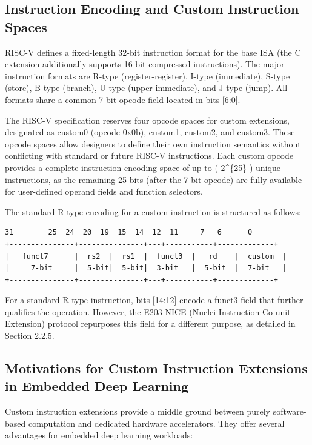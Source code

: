 \subsection{Instruction Encoding and Custom Instruction Spaces}

RISC-V defines a fixed-length 32-bit instruction format for the base ISA (the C extension additionally supports 16-bit compressed instructions). The major instruction formats are R-type (register-register), I-type (immediate), S-type (store), B-type (branch), U-type (upper immediate), and J-type (jump). All formats share a common 7-bit opcode field located in bits [6:0].


The RISC-V specification reserves four opcode spaces for custom extensions, designated as custom0 (opcode 0x0b), custom1, custom2, and custom3. These opcode spaces allow designers to define their own instruction semantics without conflicting with standard or future RISC-V instructions. Each custom opcode provides a complete instruction encoding space of up to ( 2\textasciicircum{}\{25\} ) unique instructions, as the remaining 25 bits (after the 7-bit opcode) are fully available for user-defined operand fields and function selectors.


The standard R-type encoding for a custom instruction is structured as follows:


\begin{lstlisting}[style=ascii]
31        25  24  20  19  15  14  12  11     7   6      0
+---------------+---------------+---+-----------+-------------+
|   funct7      |  rs2  |  rs1  |  funct3  |   rd    |  custom  |
|     7-bit     |  5-bit|  5-bit|  3-bit   |  5-bit  |  7-bit   |
+---------------+---------------+---+-----------+-------------+
\end{lstlisting}

For a standard R-type instruction, bits [14:12] encode a funct3 field that further qualifies the operation. However, the E203 NICE (Nuclei Instruction Co-unit Extension) protocol repurposes this field for a different purpose, as detailed in Section 2.2.5.


\subsection{Motivations for Custom Instruction Extensions in Embedded Deep Learning}

Custom instruction extensions provide a middle ground between purely software-based computation and dedicated hardware accelerators. They offer several advantages for embedded deep learning workloads:


